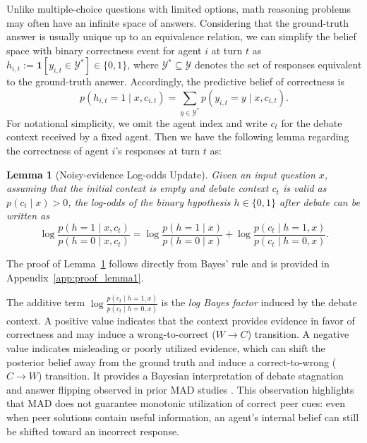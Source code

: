 \documentclass{article}
\theoremstyle{plain}
\newtheorem{lemma}[theorem]{Lemma}
\theoremstyle{definition}
\theoremstyle{remark}
\begin{document}
Unlike multiple-choice questions with limited options, math reasoning problems may often have an infinite space of answers. Considering that the ground-truth answer is usually unique up to an equivalence relation, we can simplify the belief space with binary correctness event for agent $i$ at turn $t$ as $h_{i,t} := \mathbf{1}[y_{i,t}\in \mathcal{Y}^*]\in\{0,1\}$, where $\mathcal{Y}^*\subseteq\mathcal{Y}$ denotes the set of responses equivalent to the ground-truth answer.
Accordingly, the predictive belief of correctness is
\begin{equation*}
p(h_{i,t}=1\mid x,c_{i,t})
=
\sum_{y\in \mathcal{Y}^*} p(y_{i,t}=y\mid x,c_{i,t}).
\end{equation*}
For notational simplicity, we omit the agent index and write $c_t$ for the debate context received by a fixed agent. Then we have the following lemma regarding the correctness of agent $i$'s responses at turn $t$ as: 
\begin{lemma}[Noisy-evidence Log-odds Update]\label{lem:log_odds}
Given an input question $x$, assuming that the initial context is empty and debate context $c_t$ is valid as $p(c_t\mid x)>0$, the log-odds of the binary hypothesis $h\in\{0,1\}$ after debate can be written as
{\small
\begin{equation*}
    \log \frac{p(h=1 \mid x,c_t)}{p(h=0 \mid x,c_t)}
=
\log \frac{p(h=1 \mid x)}{p(h=0 \mid x)}
+
\log \frac{p(c_t \mid h=1, x)}{p(c_t \mid h=0, x)}.
\end{equation*}
}
\end{lemma}

The proof of Lemma~\ref{lem:log_odds} follows directly from Bayes' rule and is provided in Appendix~\ref{app:proof_lemma1}.


The additive term $\log \frac{p(c_t \mid h=1, x)}{p(c_t \mid h=0, x)}$ is the \textit{log Bayes factor} induced by the debate context. A positive value indicates that the context provides evidence in favor of correctness and may induce a wrong-to-correct ($W\to C$) transition. A negative value indicates misleading or poorly utilized evidence, which can shift the posterior belief away from the ground truth and induce a correct-to-wrong ($C\to W$) transition. It provides a Bayesian interpretation of debate stagnation and answer flipping observed in prior MAD studies \cite{choi2025debate, wynn2025talk, yao2025peacemaker}. This observation highlights that MAD does not guarantee monotonic utilization of correct peer cues: even when peer solutions contain useful information, an agent's internal belief can still be shifted toward an incorrect response.
\end{document}
